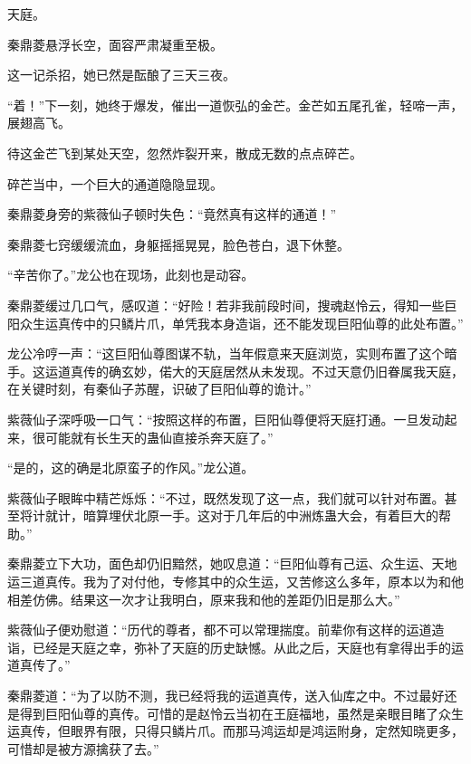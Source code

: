 
\begin{this_body}



天庭。

秦鼎菱悬浮长空，面容严肃凝重至极。

这一记杀招，她已然是酝酿了三天三夜。

“着！”下一刻，她终于爆发，催出一道恢弘的金芒。金芒如五尾孔雀，轻啼一声，展翅高飞。

待这金芒飞到某处天空，忽然炸裂开来，散成无数的点点碎芒。

碎芒当中，一个巨大的通道隐隐显现。

秦鼎菱身旁的紫薇仙子顿时失色：“竟然真有这样的通道！”

秦鼎菱七窍缓缓流血，身躯摇摇晃晃，脸色苍白，退下休整。

“辛苦你了。”龙公也在现场，此刻也是动容。

秦鼎菱缓过几口气，感叹道：“好险！若非我前段时间，搜魂赵怜云，得知一些巨阳众生运真传中的只鳞片爪，单凭我本身造诣，还不能发现巨阳仙尊的此处布置。”

龙公冷哼一声：“这巨阳仙尊图谋不轨，当年假意来天庭浏览，实则布置了这个暗手。这运道真传的确玄妙，偌大的天庭居然从未发现。不过天意仍旧眷属我天庭，在关键时刻，有秦仙子苏醒，识破了巨阳仙尊的诡计。”

紫薇仙子深呼吸一口气：“按照这样的布置，巨阳仙尊便将天庭打通。一旦发动起来，很可能就有长生天的蛊仙直接杀奔天庭了。”

“是的，这的确是北原蛮子的作风。”龙公道。

紫薇仙子眼眸中精芒烁烁：“不过，既然发现了这一点，我们就可以针对布置。甚至将计就计，暗算埋伏北原一手。这对于几年后的中洲炼蛊大会，有着巨大的帮助。”

秦鼎菱立下大功，面色却仍旧黯然，她叹息道：“巨阳仙尊有己运、众生运、天地运三道真传。我为了对付他，专修其中的众生运，又苦修这么多年，原本以为和他相差仿佛。结果这一次才让我明白，原来我和他的差距仍旧是那么大。”

紫薇仙子便劝慰道：“历代的尊者，都不可以常理揣度。前辈你有这样的运道造诣，已经是天庭之幸，弥补了天庭的历史缺憾。从此之后，天庭也有拿得出手的运道真传了。”

秦鼎菱道：“为了以防不测，我已经将我的运道真传，送入仙库之中。不过最好还是得到巨阳仙尊的真传。可惜的是赵怜云当初在王庭福地，虽然是亲眼目睹了众生运真传，但眼界有限，只得只鳞片爪。而那马鸿运却是鸿运附身，定然知晓更多，可惜却是被方源擒获了去。”


\end{this_body}
